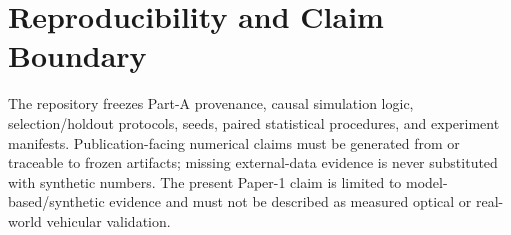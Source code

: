 \documentclass[conference]{IEEEtran}
\begin{document}
\section*{Reproducibility and Claim Boundary}
The repository freezes Part-A provenance, causal simulation logic, selection/holdout protocols, seeds, paired statistical procedures, and experiment manifests. Publication-facing numerical claims must be generated from or traceable to frozen artifacts; missing external-data evidence is never substituted with synthetic numbers. The present Paper-1 claim is limited to model-based/synthetic evidence and must not be described as measured optical or real-world vehicular validation.



\end{document}

